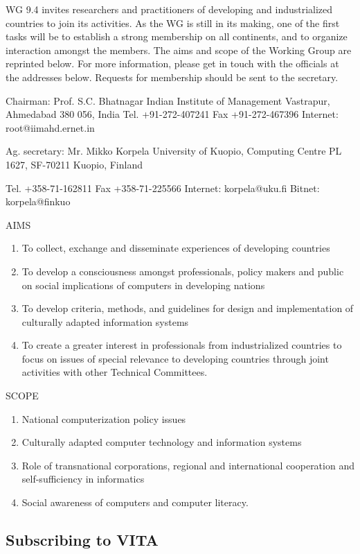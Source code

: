 WG 9.4 invites researchers and practitioners of developing
and industrialized countries to join its activities.  As the WG
is still in its making, one of the first tasks will be to
establish a strong membership on all continents, and to organize
interaction amongst the members.
The aims and scope of the Working Group are reprinted below. 
For more information, please get in touch with the officials at
the addresses below.  Requests for membership should be sent to
the secretary.

Chairman:
    Prof. S.C. Bhatnagar
    Indian Institute of Management
    Vastrapur,  Ahmedabad 380 056,  India
    Tel.       +91-272-407241
    Fax        +91-272-467396
    Internet:  root@iimahd.ernet.in

Ag. secretary:
    Mr. Mikko Korpela
    University of Kuopio,  Computing Centre
    PL 1627,  SF-70211 Kuopio,  Finland

    Tel.       +358-71-162811
    Fax        +358-71-225566
    Internet:  korpela@uku.fi
    Bitnet:    korpela@finkuo


AIMS
\begin{enumerate}
\item To collect, exchange and disseminate experiences of developing countries
\item To develop a consciousness amongst professionals, policy makers
and public on social implications of computers in developing nations 
\item To develop criteria, methods, and guidelines for design and
implementation of culturally adapted information systems 
\item To create a greater interest in professionals from
industrialized countries to focus on issues of special relevance to
developing countries through joint activities with other Technical
Committees.
\end{enumerate}

SCOPE
\begin{enumerate}
\item National computerization policy issues
\item Culturally adapted computer technology and information systems
\item Role of transnational corporations, regional and international
cooperation and self-sufficiency in informatics 
\item  Social awareness of computers and computer literacy.
\end{enumerate}

\subsection{Subscribing to VITA}

